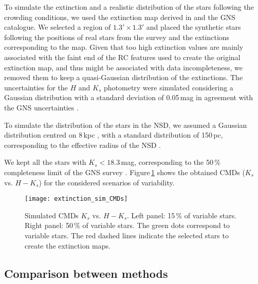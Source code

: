 \documentclass{aa}
\begin{document}
To simulate the extinction and a realistic distribution of the stars following the crowding conditions, we used the extinction map derived in \citet{Nogueras-Lara:2019ad} and the GNS catalogue. We selected a region of $1.3'\times1.3'$ and placed the synthetic stars following the positions of real stars from the survey and the extinctions corresponding to the map. Given that too high extinction values are mainly associated with the faint end of the RC features used to create the original extinction map, and thus might be associated with data incompleteness, we removed them to keep a quasi-Gaussian distribution of the extinctions. The uncertainties for the $H$ and $K_s$ photometry were simulated considering a Gaussian distribution with a standard deviation of 0.05\,mag in agreement with the GNS uncertainties \citep{Nogueras-Lara:2019aa}.

To simulate the distribution of the stars in the NSD, we assumed a Gaussian distribution centred on 8\,kpc \citep[e.g.][]{Gravity-Collaboration:2018aa,Do:2019aa}, with a standard distribution of 150\,pc, corresponding to the effective radius of the NSD \citep[e.g.][]{Nishiyama:2013uq,gallego-cano2019}.





We kept all the stars with $K_s<18.3$\,mag, corresponding to the 50\,\% completeness limit of the GNS survey \citep{Nogueras-Lara:2020aa}. Figure\,\ref{CMD_syn} shows the obtained CMDs ($K_s$ vs. $H-K_s$) for the considered scenarios of variability.


   \begin{figure}
   \texttt{[image: extinction\_sim\_CMDs]}
   \caption{Simulated CMDs $K_s$ vs. $H-K_s$. Left panel: 15\,\% of variable stars. Right panel: 50\,\% of variable stars. The green dots correspond to variable stars. The red dashed lines indicate the selected stars to create the extinction maps.}

   \label{CMD_syn}
    \end{figure}

















\subsection{Comparison between methods}
\label{ext_map_method}
\end{document}
